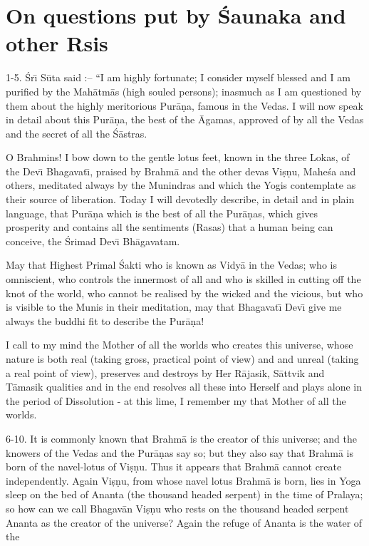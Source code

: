 \chapter{On questions put by \'Saunaka and other Rsis}

1-5. \'Sr\={\i} S\=uta said :-- ``I am highly fortunate; I consider myself blessed and I am purified by the Mah\=atm\=as (high souled persons); inasmuch as I am questioned by them about the highly meritorious Pur\=a\d{n}a, famous in the Vedas. I will now speak in detail about this Pur\=a\d{n}a, the best of the \=Agamas, approved of by all the Vedas and the secret of all the \'S\=astras.

O Brahmins! I bow down to the gentle lotus feet, known in the three Lokas, of the Dev\={\i} Bhagavat\={\i}, praised by Brahm\=a and the other devas Vi\d{s}\d{n}u, Mahe\'sa and others, meditated always by the Munindras and which the Yogis contemplate as their source of liberation. Today I will devotedly describe, in detail and in plain language, that Pur\=a\d{n}a which is the best of all the Pur\=a\d{n}as, which gives prosperity and contains all the sentiments (Rasas) that a human being can conceive, the \'Srimad Dev\={\i} Bh\=agavatam.

May that Highest Primal \'Sakti who is known as Vidy\=a in the Vedas; who is omniscient, who controls the innermost of all and who is skilled in cutting off the knot of the world, who cannot be realised by the wicked and the vicious, but who is visible to the Munis in their meditation, may that Bhagavat\={\i} Dev\={\i} give me always the buddhi fit to describe the Pur\=a\d{n}a!

I call to my mind the Mother of all the worlds who creates this universe, whose nature is both real (taking gross, practical point of view) and and unreal (taking a real point of view), preserves and destroys by Her R\=ajasik, S\=attvik and T\=amasik qualities and in the end resolves all these into Herself and plays alone in the period of Dissolution - at this lime, I remember my that Mother of all the worlds.

6-10. It is commonly known that Brahm\=a is the creator of this universe; and the knowers of the Vedas and the Pur\=a\d{n}as say so; but they also say that Brahm\=a is born of the navel-lotus of Vi\d{s}\d{n}u. Thus it appears that Brahm\=a cannot create independently. Again Vi\d{s}\d{n}u, from whose navel lotus Brahm\=a is born, lies in Yoga sleep on the bed of Ananta (the thousand headed serpent) in the time of Pralaya; so how can we call Bhagav\=an Vi\d{s}\d{n}u who rests on the thousand headed serpent Ananta as the creator of the universe? Again the refuge of Ananta is the water of the

